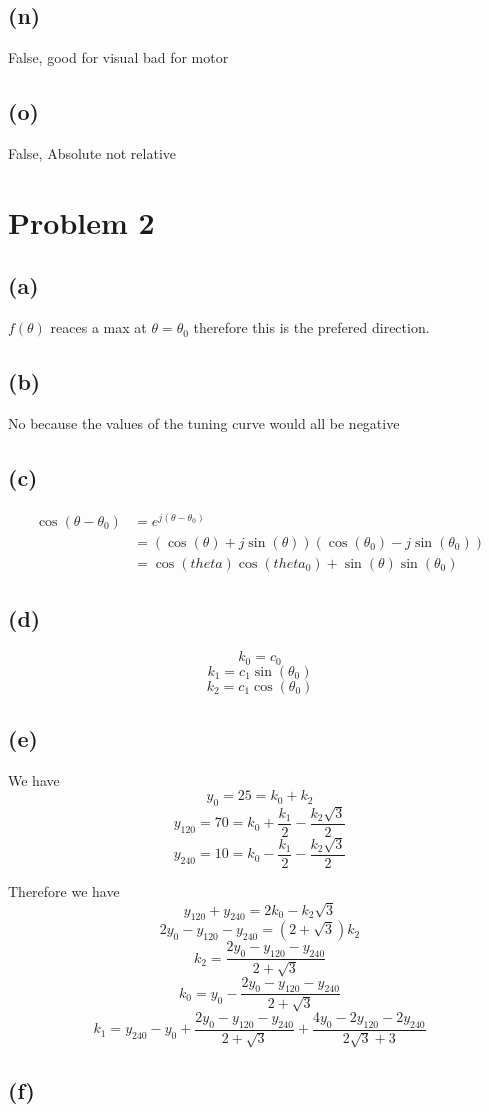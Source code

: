 \documentclass[12pt]{article}
\begin{document}
\subsection*{(n)}
False, good for visual bad for motor
\subsection*{(o)}
False, Absolute not relative


\section*{Problem 2}
\subsection*{(a)}
$f(\theta)$ reaces a max at $\theta=\theta_0$ therefore this
is the prefered direction.
\subsection*{(b)}
No because the values of the tuning curve would all be negative
\subsection*{(c)}
\begin{align*}
    \cos(\theta-\theta_0)&=e^{j(\theta-\theta_0)}\\
    &=(\cos(\theta)+j\sin(\theta))(\cos(\theta_0)-j\sin(\theta_0))\\
    &=\cos(theta)\cos(theta_0)+\sin(\theta)\sin(\theta_0)
\end{align*}
\subsection*{(d)}
$$k_0=c_0$$
$$k_1=c_1\sin(\theta_0)$$
$$k_2=c_1\cos(\theta_0)$$
\subsection*{(e)}
We have
$$y_0=25=k_0+k_2$$
$$y_{120}=70=k_0+\frac{k_1}{2}-\frac{k_2\sqrt{3}}{2}$$
$$y_{240}=10=k_0-\frac{k_1}{2}-\frac{k_2\sqrt{3}}{2}$$

Therefore we have
$$y_{120}+y_{240}=2k_0-k_2\sqrt{3}$$
$$2y_0-y_{120}-y_{240}=(2+\sqrt{3})k_2$$
$$k_2=\boxed{\frac{2y_0-y_{120}-y_{240}}{2+\sqrt{3}}}$$
$$k_0=\boxed{y_0-\frac{2y_0-y_{120}-y_{240}}{2+\sqrt{3}}}$$
$$k_1=\boxed{y_{240}-y_0+\frac{2y_0-y_{120}-y_{240}}{2+\sqrt{3}}+\frac{4y_0-2y_{120}-2y_{240}}{2\sqrt{3}+3}}$$
\subsection*{(f)}
\end{document}
